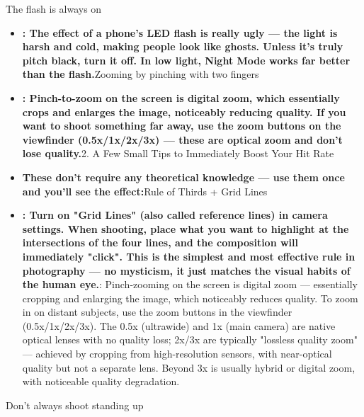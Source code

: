 


The flash is always on

\begin{itemize}
  \item \textbf{: The effect of a phone's LED flash is really ugly — the light is harsh and cold, making people look like ghosts. Unless it's truly pitch black, turn it off. In low light, Night Mode works far better than the flash.}Zooming by pinching with two fingers
  \item \textbf{: Pinch-to-zoom on the screen is digital zoom, which essentially crops and enlarges the image, noticeably reducing quality. If you want to shoot something far away, use the zoom buttons on the viewfinder (0.5x/1x/2x/3x) — these are optical zoom and don't lose quality.}2. A Few Small Tips to Immediately Boost Your Hit Rate
  \item \textbf{These don't require any theoretical knowledge — use them once and you'll see the effect:}Rule of Thirds + Grid Lines
  \item \textbf{: Turn on "Grid Lines" (also called reference lines) in camera settings. When shooting, place what you want to highlight at the intersections of the four lines, and the composition will immediately "click". This is the simplest and most effective rule in photography — no mysticism, it just matches the visual habits of the human eye.}: Pinch-zooming on the screen is digital zoom — essentially cropping and enlarging the image, which noticeably reduces quality. To zoom in on distant subjects, use the zoom buttons in the viewfinder (0.5x/1x/2x/3x). The 0.5x (ultrawide) and 1x (main camera) are native optical lenses with no quality loss; 2x/3x are typically "lossless quality zoom" — achieved by cropping from high-resolution sensors, with near-optical quality but not a separate lens. Beyond 3x is usually hybrid or digital zoom, with noticeable quality degradation.
\end{itemize}


Don't always shoot standing up

